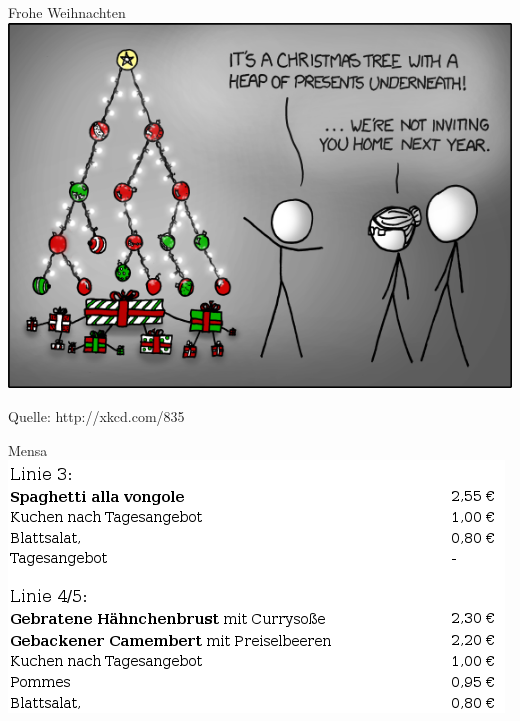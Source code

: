 \documentclass[18pt]{beamer}
\begin{document}
\begin{frame}{Frohe Weihnachten}
 \includegraphics[scale=0.5]{08_tree}
 
 Quelle: http://xkcd.com/835
\end{frame}
\begin{frame}{Mensa}
 \includegraphics[scale=0.7]{mensa}
\end{frame}
\end{document}
